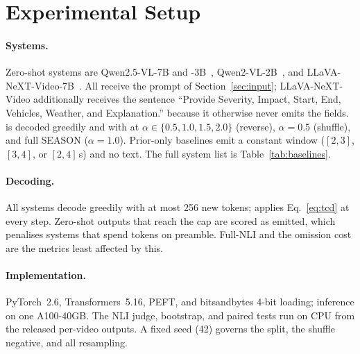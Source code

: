 \section{Experimental Setup}
\label{sec:setup}

\paragraph{Systems.}
Zero-shot systems are Qwen2.5-VL-7B and -3B~\cite{qwen25vl}, Qwen2-VL-2B~\cite{qwen2vl}, and LLaVA-NeXT-Video-7B~\cite{llavanextvideo}.
All receive the prompt of Section~\ref{sec:input}; LLaVA-NeXT-Video additionally receives the sentence ``Provide Severity, Impact, Start, End, Vehicles, Weather, and Explanation.'' because it otherwise never emits the fields.
\crashlogic{} is decoded greedily and with \tcd{} at $\alpha\in\{0.5,1.0,1.5,2.0\}$ (reverse), $\alpha{=}0.5$ (shuffle), and full SEASON ($\alpha{=}1.0$).
Prior-only baselines emit a constant window ($[2,3]$, $[3,4]$, or $[2,4]$\,s) and no text.
The full system list is Table~\ref{tab:baselines}.

\paragraph{Decoding.}
All systems decode greedily with at most 256 new tokens; \tcd{} applies Eq.~\eqref{eq:tcd} at every step.
Zero-shot outputs that reach the cap are scored as emitted, which penalises systems that spend tokens on preamble.
Full-NLI and the omission cost are the metrics least affected by this.

\paragraph{Implementation.}
PyTorch~2.6, Transformers~5.16, PEFT, and bitsandbytes 4-bit loading; inference on one A100-40GB.
The NLI judge, bootstrap, and paired tests run on CPU from the released per-video outputs.
A fixed seed (42) governs the split, the shuffle negative, and all resampling.
